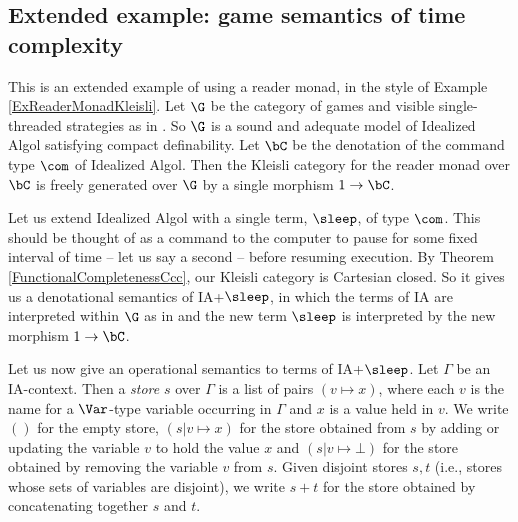 

\subsection{Extended example: game semantics of time complexity}
This is an extended example of using a reader monad, in the style of Example \ref{ExReaderMonadKleisli}.
Let $\G$ be the category of games and visible single-threaded strategies as in \cite{SamsonGuyIAActive}.  
So $\G$ is a sound and adequate model of Idealized Algol satisfying compact definability.
Let $\bC$ be the denotation of the command type $\com$ of Idealized Algol.  
Then the Kleisli category for the reader monad over $\bC$ is freely generated over $\G$ by a single morphism $1 \to \bC$.  

Let us extend Idealized Algol with a single term, $\sleep$, of type $\com$.
This should be thought of as a command to the computer to pause for some fixed interval of time -- let us say a second -- before resuming execution.
By Theorem \ref{FunctionalCompletenessCcc}, our Kleisli category is Cartesian closed.
So it gives us a denotational semantics of IA+$\sleep$, in which the terms of IA are interpreted within $\G$ as in \cite{SamsonGuyIAActive} and the new term $\sleep$ is interpreted by the new morphism $1 \to \bC$.

Let us now give an operational semantics to terms of IA+$\sleep$.  
Let $\Gamma$ be an IA-context.
Then a \emph{store} $s$ over $\Gamma$ is a list of pairs $(v\mapsto x)$, where each $v$ is the name for a $\Var$-type variable occurring in $\Gamma$ and $x$ is a value held in $v$.  
We write $()$ for the empty store, $(s\vert v\mapsto x)$ for the store obtained from $s$ by adding or updating the variable $v$ to hold the value $x$ and $(s\vert v\mapsto \bot)$ for the store obtained by removing the variable $v$ from $s$.
Given disjoint stores $s,t$ (i.e., stores whose sets of variables are disjoint), we write $s+t$ for the store obtained by concatenating together $s$ and $t$.  

